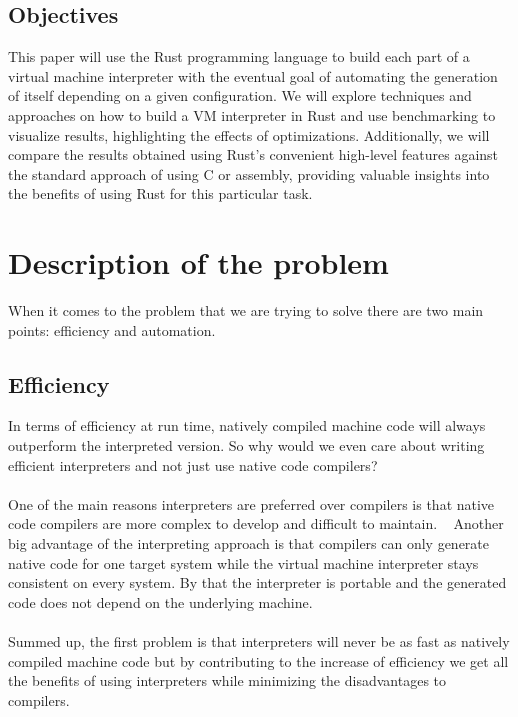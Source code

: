 \documentclass{article}
\begin{document}
\subsection{Objectives} 
This paper will use the Rust programming language to build each part of a
virtual machine interpreter with the eventual goal of automating the generation
of itself depending on a given configuration. We will explore techniques and
approaches on how to build a VM interpreter in Rust and use benchmarking to
visualize results, highlighting the effects of optimizations. Additionally, we
will compare the results obtained using Rust's convenient high-level features
against the standard approach of using C or assembly, providing valuable
insights into the benefits of using Rust for this particular task.

\section{Description of the problem}
When it comes to the problem that we are trying to solve there are two main
points: efficiency and automation.

\subsection{Efficiency}
In terms of efficiency at run time, natively compiled machine code will always
outperform the interpreted version. So why would we even care about writing
efficient interpreters and not just use native code compilers?
\\ \\
One of the main reasons interpreters are preferred over compilers is that
native code compilers are more complex to develop and difficult to maintain.
~\cite{structure_and_performance} Another big advantage of the interpreting
approach is that compilers can only generate native code for one target system
while the virtual machine interpreter stays consistent on every system. By that
the interpreter is portable and the generated code does not depend on the
underlying machine.
\\ \\
Summed up, the first problem is that interpreters will never be as fast as
natively compiled machine code but by contributing to the increase of efficiency
we get all the benefits of using interpreters while minimizing the
disadvantages to compilers.
\end{document}
